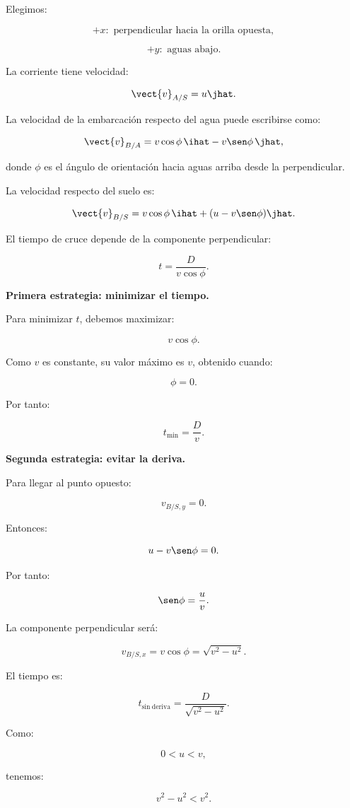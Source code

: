 \begin{explicacion}
Elegimos:

\[
+x:\text{ perpendicular hacia la orilla opuesta},
\]

\[
+y:\text{ aguas abajo}.
\]

La corriente tiene velocidad:

\[
\vect{v}_{A/S}=u\jhat.
\]

La velocidad de la embarcación respecto
del agua puede escribirse como:

\[
\vect{v}_{B/A}
=
v\cos\phi\,\ihat
-
v\sen\phi\,\jhat,
\]

donde \(\phi\) es el ángulo de orientación
hacia aguas arriba desde la perpendicular.

La velocidad respecto del suelo es:

\[
\vect{v}_{B/S}
=
v\cos\phi\,\ihat
+
(u-v\sen\phi)\jhat.
\]

El tiempo de cruce depende de la componente
perpendicular:

\[
t=\frac{D}{v\cos\phi}.
\]

\textbf{Primera estrategia: minimizar el tiempo.}

Para minimizar \(t\), debemos maximizar:

\[
v\cos\phi.
\]

Como \(v\) es constante, su valor máximo es \(v\),
obtenido cuando:

\[
\phi=0.
\]

Por tanto:

\[
\boxed{
t_{\min}=\frac{D}{v}
}.
\]

\textbf{Segunda estrategia: evitar la deriva.}

Para llegar al punto opuesto:

\[
v_{B/S,y}=0.
\]

Entonces:

\[
u-v\sen\phi=0.
\]

Por tanto:

\[
\sen\phi=\frac{u}{v}.
\]

La componente perpendicular será:

\[
v_{B/S,x}
=
v\cos\phi
=
\sqrt{v^2-u^2}.
\]

El tiempo es:

\[
\boxed{
t_{\mathrm{sin\ deriva}}
=
\frac{D}{\sqrt{v^2-u^2}}
}.
\]

Como:

\[
0<u<v,
\]

tenemos:

\[
v^2-u^2<v^2.
\]


\end{explicacion}
